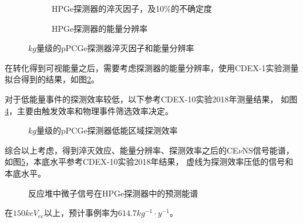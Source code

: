 \begin{figure}
  \begin{subfigure}{.5\textwidth}
    \centering
    
    \caption{\label{fig:ge_quenching_factor} HPGe探测器的淬灭因子，及10\%的不确定度\cite{zhao_search_2016}}
  \end{subfigure}
  \begin{subfigure}{.5\textwidth}
    \centering
    
    \caption{\label{fig:ge_resolution} HPGe探测器的能量分辨率}
  \end{subfigure}
  \caption{\label{fig:ge_qf_reso} $\si{kg}$量级的pPCGe探测器淬灭因子和能量分辨率}
\end{figure}

在转化得到可视能量之后，需要考虑探测器的能量分辨率，使用CDEX-1实验测量拟合得到的结果，如图\ref{fig:ge_resolution}。

对于低能量事件的探测效率较低，以下参考CDEX-10实验2018年测量结果\cite{jiang_limits_2018}，
如图\ref{fig:ge_efficiency}，主要由触发效率和物理事件筛选效率决定。

\begin{figure}
  \centering
  
  \caption{\label{fig:ge_efficiency} $\si{kg}$量级的pPCGe探测器低能区域探测效率\cite{jiang_limits_2018}}
\end{figure}

综合以上考虑，得到淬灭效应、能量分辨率、探测效率之后的CE$\nu$NS信号能谱，
如图\ref{fig:event_smear_Ge_rate_prediction}，本底水平参考CDEX-10实验2018年结果\cite{jiang_limits_2018}，
虚线为探测效率压低的信号和本底水平。

\begin{figure}
  \centering
  
  \caption{\label{fig:event_smear_Ge_rate_prediction} 
  反应堆中微子信号在HPGe探测器中的预测能谱}
\end{figure}

在$150\si{keV_{ee}}$以上，预计事例率为$614.7\si{kg^{-1}\cdot y^{-1}}$。
